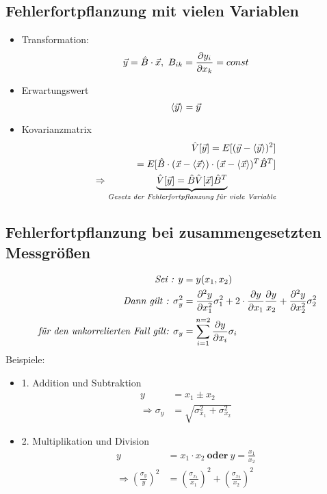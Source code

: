 \documentclass[10pt,a4paper]{article}
\begin{document}
\subsection{Fehlerfortpflanzung mit vielen Variablen}
\begin{itemize}
\item Transformation:
\begin{equation}
\vec{y}=\hat{B}\cdot\vec{x},~B_{ik}=\frac{\partial y_i}{\partial x_k}=const \notag
\end{equation}
\item Erwartungswert
\begin{equation}
\langle \vec{y} \rangle = \vec{y} \notag
\end{equation}
\item Kovarianzmatrix
\begin{align}
\hat{V}[\vec{y}]=E[(\vec{y}-\langle \vec{y} \rangle)^2] \notag \\
=E[\hat{B}\cdot (\vec{x}-\langle \vec{x} \rangle)\cdot (\vec{x}-\langle \vec{x} \rangle)^T \hat{B}^T] \notag \\
\Rightarrow \underbrace{\hat{V}[\vec{y}]=\hat{B}\hat{V}[\vec{x}]\hat{B}^T}_{\textit{Gesetz der Fehlerfortpflanzung für viele Variable}}
\end{align}
\end{itemize}

\subsection{Fehlerfortpflanzung bei zusammengesetzten Messgrößen}
\begin{align}
\textit{Sei : } y&=y(x_1,x_2) \notag \\
\textit{Dann gilt : } \sigma^2_y &=\frac{\partial^2 y}{\partial x^2_1}\sigma^2_1+2 \cdot \frac{\partial y}{\partial x_1} \frac{\partial y}{x_2} + \frac{\partial^2 y}{\partial x^2_2}\sigma^2_2 \\
\textit{für den unkorrelierten Fall gilt: } \sigma_y &= \sum^{n=2}_{i=1}{\frac{\partial y}{\partial x_i} \sigma_i}
\end{align}
Beispiele:
\begin{itemize}
\item 1. Addition und Subtraktion
\begin{align*}
y&= x_1 \pm x_2 \\
\Rightarrow \sigma_y&=\sqrt{\sigma^2_{x_1}+\sigma^2_{x_2}}
\end{align*}
\item 2. Multiplikation und Division
\begin{align*}
y&= x_1 \cdot x_2~\textbf{oder}~ y=\frac{x_1}{x_2} \\
\Rightarrow (\frac{\sigma_y}{y})^2&=(\frac{\sigma_{x_1}}{x_1})^2+(\frac{\sigma_{x_2}}{x_2})^2
\end{align*}
\end{itemize}
\end{document}
